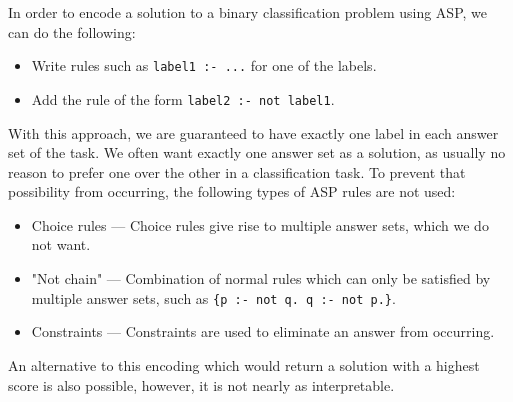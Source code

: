 In order to encode a solution to a binary classification problem using ASP, we can do the following:
\begin{itemize}
    \item Write rules such as \verb+label1 :- ...+  for one of the labels.
    \item Add the rule of the form \verb+label2 :- not label1+.
\end{itemize}
With this approach, we are guaranteed to have exactly one label in each answer set of the task.
We often want exactly one answer set as a solution, as usually no reason to prefer one over the other in a classification task.
To prevent that possibility from occurring, the following types of ASP rules are not used:
\begin{itemize}
    \item Choice rules --- Choice rules give rise to multiple answer sets, which we do not want.
    \item "Not chain" --- Combination of normal rules which can only be satisfied by multiple answer sets, such as \verb+{p :- not q. q :- not p.}+.
    \item Constraints --- Constraints are used to eliminate an answer from occurring.
\end{itemize}

An alternative to this encoding which would return a solution with a highest score is also possible, however, it is not nearly as interpretable.

